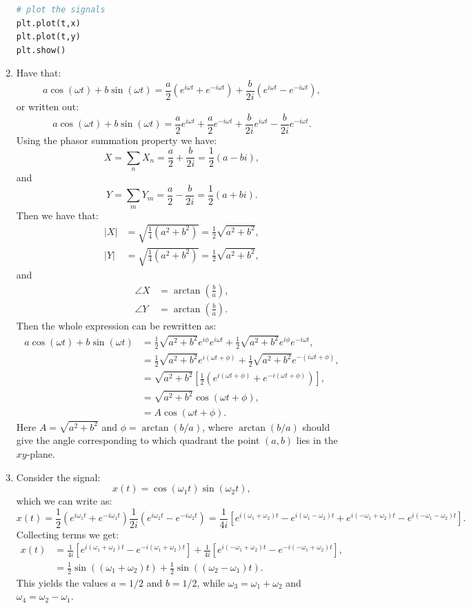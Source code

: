 \begin{enumerate}
\begin{lstlisting}[language=Python, caption=Noise canceling signal,label=cancel]
# plot the signals
plt.plot(t,x)
plt.plot(t,y)
plt.show()
\end{lstlisting}
\item Have that:
$$a\cos(\omega t)+b\sin(\omega t)=\frac{a}{2}(e^{i\omega t}+e^{-i\omega t})+\frac{b}{2i}(e^{i\omega t}-e^{-i\omega t}),$$
or written out:
$$a\cos(\omega t)+b\sin(\omega t)=\frac{a}{2}e^{i\omega t}+\frac{a}{2}e^{-i\omega t}+\frac{b}{2i}e^{i\omega t}-\frac{b}{2i}e^{-i\omega t}.$$
Using the phasor summation property we have:
$$X=\sum_{n}X_{n}=\frac{a}{2}+\frac{b}{2i}=\frac{1}{2}(a-bi),$$
and
$$Y=\sum_{m}Y_{m}=\frac{a}{2}-\frac{b}{2i}=\frac{1}{2}(a+bi).$$
Then we have that:
\begin{align*}
    |X|&=\sqrt{\frac{1}{4}(a^{2}+b^{2})}=\frac{1}{2}\sqrt{a^{2}+b^{2}}, \\
    |Y|&=\sqrt{\frac{1}{4}(a^{2}+b^{2})}=\frac{1}{2}\sqrt{a^{2}+b^{2}},
\end{align*}
and
\begin{align*}
    \angle X&=\arctan\left(\frac{b}{a}\right), \\
    \angle Y&=\arctan\left(\frac{b}{a}\right).
\end{align*}
Then the whole expression can be rewritten as:
\begin{align*}
    a\cos(\omega t)+b\sin(\omega t)&=\frac{1}{2}\sqrt{a^{2}+b^{2}}e^{i\phi}e^{i\omega t}+\frac{1}{2}\sqrt{a^{2}+b^{2}}e^{i\phi}e^{-i\omega t}, \\
    &=\frac{1}{2}\sqrt{a^{2}+b^{2}}e^{i(\omega t+\phi)}+\frac{1}{2}\sqrt{a^{2}+b^{2}}e^{-(i\omega t+\phi)}, \\
    &=\sqrt{a^{2}+b^{2}}\left[\frac{1}{2}\left(e^{i(\omega t+\phi)}+e^{-i(\omega t+\phi)}\right)\right], \\
    &=\sqrt{a^{2}+b^{2}}\cos(\omega t+\phi), \\
    &=A\cos(\omega t+\phi).
\end{align*}
Here $A=\sqrt{a^{2}+b^{2}}$ and $\phi=\arctan(b/a)$, where $\arctan(b/a)$ 
should give the angle corresponding to which quadrant the point $(a,b)$ lies in the $xy$-plane. 

\item Consider the signal:
$$x(t)=\cos(\omega_{1}t)\sin(\omega_{2}t),$$
which we can write as:
$$x(t)=\frac{1}{2}(e^{i\omega_{1}t}+e^{-i\omega_{1} t})\frac{1}{2i}(e^{i\omega_{2}t}-e^{-i\omega_{2}t})=\frac{1}{4i}[e^{i(\omega_{1}+\omega_{2})t}-e^{i(\omega_{1}-\omega_{2})t}+e^{i(-\omega_{1}+\omega_{2})t}-e^{i(-\omega_{1}-\omega_{2})t}].$$
Collecting terms we get:
\begin{align*}
    x(t)&=\frac{1}{4i}[e^{i(\omega_{1}+\omega_{2})t}-e^{-i(\omega_{1}+\omega_{2})t}]+\frac{1}{4i}[e^{i(-\omega_{1}+\omega_{2})t}-e^{-i(-\omega_{1}+\omega_{2})t}], \\
    &=\frac{1}{2}\sin((\omega_{1}+\omega_{2})t)+\frac{1}{2}\sin((\omega_{2}-\omega_{1})t).
\end{align*}
This yields the values $a=1/2$ and $b=1/2$, while $\omega_{3}=\omega_{1}+\omega_{2}$ and $\omega_{4}=\omega_{2}-\omega_{1}$. 


\end{enumerate}
